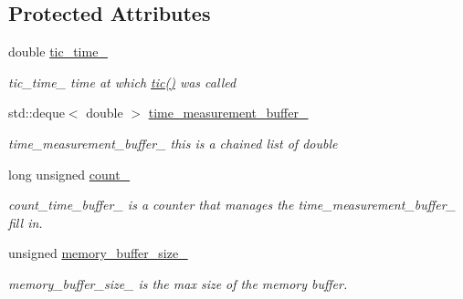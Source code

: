 \subsection*{Protected Attributes}
\begin{DoxyCompactItemize}
\item 
\mbox{\label{classreal__time__tools_1_1Timer_a19c7f3297d2762948843afaba92eade6}} 
double \hyperlink{classreal__time__tools_1_1Timer_a19c7f3297d2762948843afaba92eade6}{tic\+\_\+time\+\_\+}
\begin{DoxyCompactList}\small\item\em tic\+\_\+time\+\_\+ time at which \hyperlink{classreal__time__tools_1_1Timer_a540f7f6925768c6f333b2fef4a914374}{tic()} was called \end{DoxyCompactList}\item 
\mbox{\label{classreal__time__tools_1_1Timer_a9b509f58fc1eef3f7ce4145f75c01fa9}} 
std\+::deque$<$ double $>$ \hyperlink{classreal__time__tools_1_1Timer_a9b509f58fc1eef3f7ce4145f75c01fa9}{time\+\_\+measurement\+\_\+buffer\+\_\+}
\begin{DoxyCompactList}\small\item\em time\+\_\+measurement\+\_\+buffer\+\_\+ this is a chained list of double \end{DoxyCompactList}\item 
\mbox{\label{classreal__time__tools_1_1Timer_a3967e7252cf6d9795e5b04c60763037d}} 
long unsigned \hyperlink{classreal__time__tools_1_1Timer_a3967e7252cf6d9795e5b04c60763037d}{count\+\_\+}
\begin{DoxyCompactList}\small\item\em count\+\_\+time\+\_\+buffer\+\_\+ is a counter that manages the time\+\_\+measurement\+\_\+buffer\+\_\+ fill in. \end{DoxyCompactList}\item 
\mbox{\label{classreal__time__tools_1_1Timer_ac0f102a03a84fdebd3803a0199e352a2}} 
unsigned \hyperlink{classreal__time__tools_1_1Timer_ac0f102a03a84fdebd3803a0199e352a2}{memory\+\_\+buffer\+\_\+size\+\_\+}
\begin{DoxyCompactList}\small\item\em memory\+\_\+buffer\+\_\+size\+\_\+ is the max size of the memory buffer. \end{DoxyCompactList}\item 

\end{DoxyCompactItemize}

